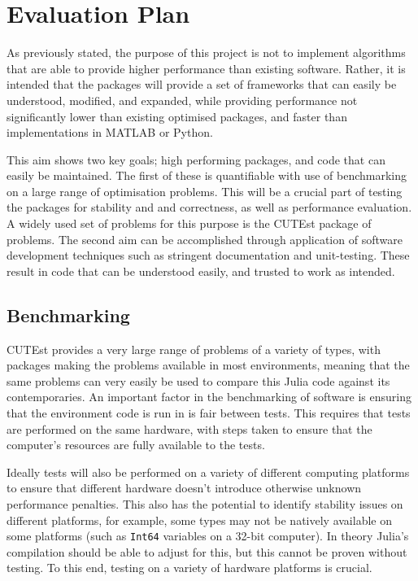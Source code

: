 \section{Evaluation Plan}
As previously stated, the purpose of this project is not to implement algorithms that are able to provide higher performance than existing software. Rather, it is intended that the packages will provide a set of frameworks that can easily be understood, modified, and expanded, while providing performance not significantly lower than existing optimised packages, and faster than implementations in MATLAB or Python.

This aim shows two key goals; high performing packages, and code that can easily be maintained. The first of these is quantifiable with use of benchmarking on a large range of optimisation problems. This will be a crucial part of testing the packages for stability and and correctness, as well as performance evaluation. A widely used set of problems for this purpose is the CUTEst package of problems. The second aim can be accomplished through application of software development techniques such as stringent documentation and unit-testing. These result in code that can be understood easily, and trusted to work as intended.

\subsection{Benchmarking}\label{sub_evaluation}
CUTEst provides a very large range of problems of a variety of types, with packages making the problems available in most environments, meaning that the same problems can very easily be used to compare this Julia code against its contemporaries. An important factor in the benchmarking of software is ensuring that the environment code is run in is fair between tests. This requires that tests are performed on the same hardware, with steps taken to ensure that the computer's resources are fully available to the tests. 

Ideally tests will also be performed on a variety of different computing platforms to ensure that different hardware doesn't introduce otherwise unknown performance penalties. This also has the potential to identify stability issues on different platforms, for example, some types may not be natively available on some platforms (such as \texttt{Int64} variables on a    32-bit computer). In theory Julia's compilation should be able to adjust for this, but this cannot be proven without testing. To this end, testing on a variety of hardware platforms is crucial.

